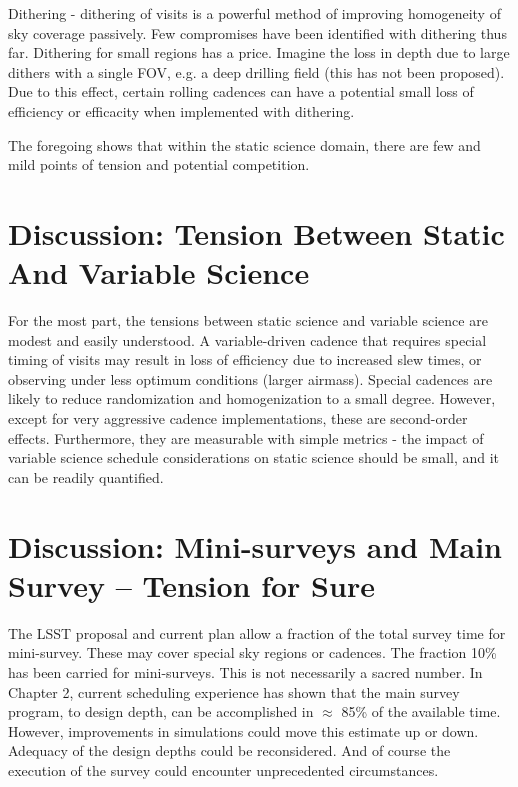 Dithering - dithering of visits is a powerful method of improving
homogeneity of sky coverage passively. Few compromises have been
identified with dithering thus far.  Dithering for small regions has a
price. Imagine the loss in depth due to large dithers with a single FOV,
e.g. a deep drilling field (this has not been proposed).  Due to this
effect, certain rolling cadences can have a potential small loss of
efficiency or efficacity when implemented with dithering.

The foregoing shows that within the static science domain, there are few
and mild points of tension and potential competition.


\section{Discussion: Tension Between Static And Variable Science}

For the most part, the tensions between static science and variable
science are modest and easily understood.  A variable-driven cadence
that requires special timing of visits may result in loss of efficiency
due to increased slew times, or observing under less optimum conditions
(larger airmass).  Special cadences are likely to reduce randomization
and homogenization to a small degree. However, except for very
aggressive cadence implementations, these are second-order effects.
Furthermore, they are measurable with simple metrics - the impact of
variable science schedule considerations on static science should be
small, and it can be readily quantified.


\section{Discussion: Mini-surveys and Main Survey -- Tension for Sure}

The LSST proposal and current plan allow a fraction of the total survey
time for mini-survey. These may cover special sky regions or cadences.
The fraction 10\% has been carried for mini-surveys.  This is not
necessarily a sacred number. In Chapter 2, current scheduling experience
has shown that the main survey program, to design depth, can be
accomplished in $\approx$ 85\% of the available time. However,
improvements in simulations could move this estimate up or down.
Adequacy of the design depths could be reconsidered.  And of course the
execution of the survey could encounter unprecedented circumstances.

